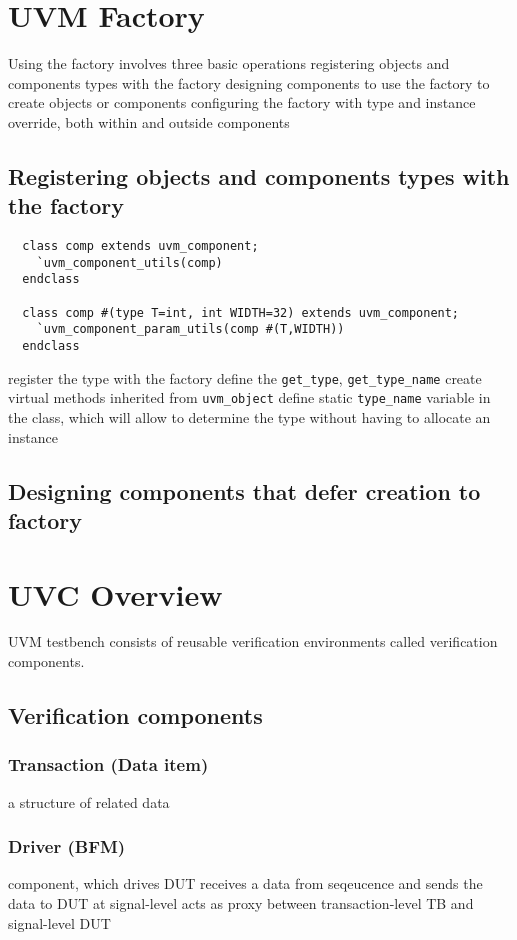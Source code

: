 \documentclass{note}
\begin{document}
\section{UVM Factory}
Using the factory involves three basic operations
\bit
\w registering objects and components types with the factory
\w designing components to use the factory to create objects or components
\w configuring the factory with type and  instance override, both within and
  outside components 
\eit

\subsection{Registering objects and components types with the factory}
\begin{verbatim}
  class comp extends uvm_component;
    `uvm_component_utils(comp)
  endclass

  class comp #(type T=int, int WIDTH=32) extends uvm_component;
    `uvm_component_param_utils(comp #(T,WIDTH))
  endclass
\end{verbatim}
\bit
\w register the type with the factory 
\w define the \verb+get_type+, \verb+get_type_name+
\w create virtual methods inherited from \verb+uvm_object+
\w define static \verb+type_name+ variable in the class, which will allow to
   determine the type without having to allocate an instance
\eit

\subsection{Designing components that defer creation to factory}
\bit
\w 
\eit




\section{UVC Overview}
\bit
\w UVM \textcolor{red2}{testbench} consists of reusable verification
environments called \textcolor{red2}{verification components}.
\eit

\subsection{Verification components}
\subsubsection{Transaction (Data item)}
\bit
\w a structure of related data
\eit
\subsubsection{Driver (BFM)}
\bit
\w {} component, which drives DUT
\w receives a data from seqeucence and sends the data to DUT at signal-level
\w acts as proxy between transaction-level TB and signal-level DUT
\eit
\end{document}
